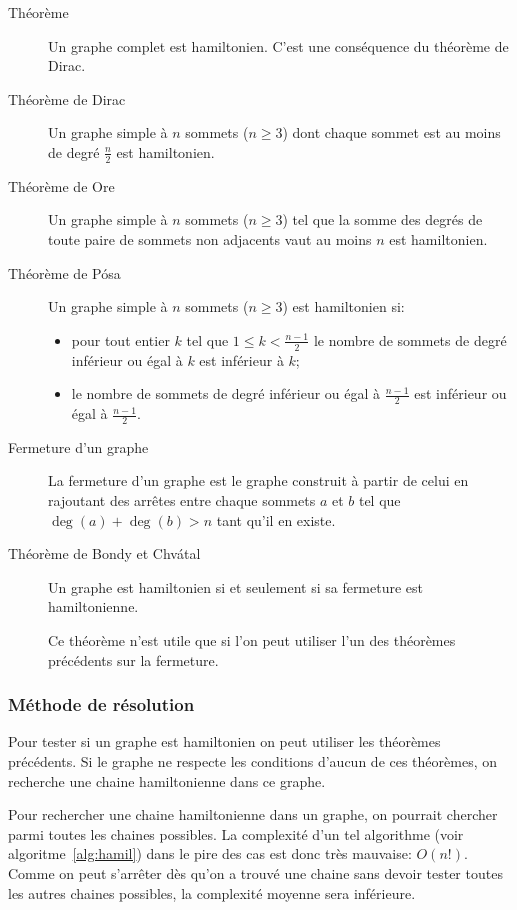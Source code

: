     \begin{description}
      \item[Théorème] Un graphe complet est hamiltonien. C'est une conséquence
        du théorème de Dirac.
      \item[Théorème de Dirac] Un graphe simple à $n$ sommets ($n \ge 3$) dont
        chaque sommet est au moins de degré $\frac{n}{2}$ est hamiltonien.
      \item[Théorème de Ore] Un graphe simple à $n$ sommets ($n \ge 3$) tel que
        la somme des degrés de toute paire de sommets non adjacents vaut au
        moins $n$ est hamiltonien.
      \item[Théorème de Pósa] Un graphe simple à $n$ sommets ($n \ge 3$) est
        hamiltonien si:
        \begin{itemize}
          \item pour tout entier $k$ tel que $1 \le k < \frac{n-1}{2}$ le
            nombre de sommets de degré inférieur ou égal à $k$ est inférieur à
            $k$;
          \item le nombre de sommets de degré inférieur ou égal à
            $\frac{n-1}{2}$ est inférieur ou égal à $\frac{n-1}{2}$.
        \end{itemize}
      \item[Fermeture d'un graphe] La fermeture d'un graphe est le graphe
        construit à partir de celui en rajoutant des arrêtes entre chaque
        sommets $a$ et $b$ tel que $\deg(a)+\deg(b) > n$ tant qu'il en existe.
      \item[Théorème de Bondy et Chvátal] Un graphe est hamiltonien si et
        seulement si sa fermeture est hamiltonienne.

        Ce théorème n'est utile que si l'on peut utiliser l'un des théorèmes
        précédents sur la fermeture.
    \end{description}

  \subsubsection{Méthode de résolution}
    Pour tester si un graphe est hamiltonien on peut utiliser les théorèmes
    précédents. Si le graphe ne respecte les conditions d'aucun de ces
    théorèmes, on recherche une chaine hamiltonienne dans ce graphe.

    Pour rechercher une chaine hamiltonienne dans un graphe, on pourrait
    chercher parmi toutes les chaines possibles. La complexité d'un tel
    algorithme (voir algoritme~\ref{alg:hamil}) dans le pire des cas est donc
    très mauvaise: $O(n!)$. Comme on peut s'arrêter dès qu'on a trouvé une
    chaine sans devoir tester toutes les autres chaines possibles, la
    complexité moyenne sera inférieure.

